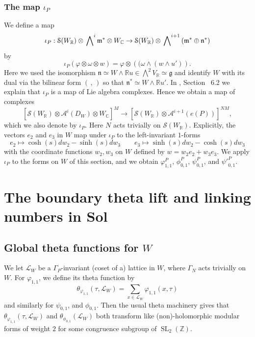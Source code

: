 \documentclass[12pt,leqno]{amsart}
\numberwithin{equation}{section}
\theoremstyle{plain}
\theoremstyle{definition}
\theoremstyle{remark}
\newcommand{\R}{\mathbb{R}}
\newcommand{\Z}{\mathbb{Z}}
\newcommand{\C}{\mathbb{C}}
\newcommand{\G}{\Gamma}
\newcommand{\wwedge}[1]{\sideset{}{^{#1}}\bigwedge}
\newcommand{\calA}{\mathcal{A}}
\newcommand{\calL}{\mathcal{L}}
\newcommand{\calS}{\mathcal{S}}
\newcommand{\Sl}{\operatorname{SL}}
\begin{document}
\subsubsection{The map $\iota_P$}\label{iotaP}

We define a map 
\[
\iota_P: \calS(W_{\R}) \otimes \wwedge{i} \mathfrak{m}^{\ast} \otimes W_{\C} \to \calS(W_{\R}) \otimes \wwedge{i+1} \left( \mathfrak{m}^{\ast} \oplus  \mathfrak{n}^{\ast} \right) 
\]
by 
\[
\iota_P(\varphi \otimes \omega \otimes w) = \varphi \otimes \left((\omega \wedge (w \wedge u')\right).
\]
Here we used the isomorphism $\mathfrak{n} \simeq W \wedge \R u \in \bigwedge^{2} V_\R \simeq \mathfrak{g}$ and identify $W$ with its dual via the bilinear form $(\,,\,)$ so that $\mathfrak{n}^{\ast} \simeq W \wedge \R u'$. In \cite{FMres}, Section ~6.2 we explain that $\iota_P$ is a map of Lie algebra complexes. Hence we obtain a map of complexes
\[
[\calS(W_{\R}) \otimes \calA^i(D_W) \otimes W_{\C}]^M \to [\calS(W_{\R}) \otimes \calA^{i+1}(e(P))]^{NM}, 
\]
which we also denote by $\iota_P$. Here $N$ acts trivially on $\calS(W_{\R})$. Explicitly, the vectors $e_2$ and $e_3$ in $W$ map under $\iota_P$ to the left-invariant $1$-forms
\[
e_2 \mapsto \cosh(s)dw_2 - \sinh(s)dw_3 \qquad e_3 \mapsto \sinh(s)dw_2 - \cosh(s)dw_3
\]
with the coordinate functions $w_2,w_3$ on $W$ defined by $w=w_2e_2+w_3e_3$. We apply $\iota_P$ to the forms on $W$ of this section, and we obtain $\varphi_{1,1}^P$, $\phi_{0,1}^P$, $\psi_{0,1}^P$, and ${\psi'}_{0,1}^P$.



\section{The boundary theta lift and linking numbers in Sol}

\subsection{Global theta functions for $W$}

We let $\calL_W$ be a $\G_P$-invariant (coset of a) lattice in $W$, where $\G_N$ acts trivially on $W$. For $\varphi_{1,1}$, we define its theta function by 
\[
\theta_{\varphi_{1,1}}(\tau,{\calL_W})= \sum_{x \in \calL_W} \varphi_{1,1}(x,\tau)
\]
and similarly for $\psi_{0,1}$, and $\phi_{0,1}$. Then the usual theta machinery gives that
$\theta_{\varphi_{1,1}}(\tau,{\calL_W})$ and $\theta_{\phi_{0,1}}(\calL_W)$ both transform like (non)-holomorphic modular forms of weight $2$ for some congruence subgroup of $\Sl_2(\Z)$. 
\end{document}
